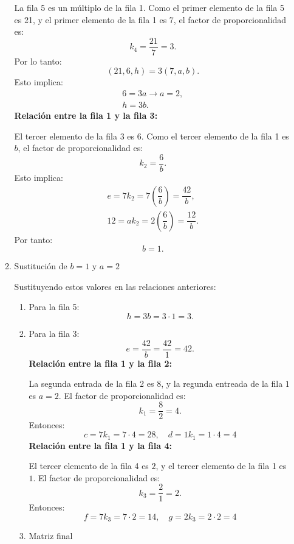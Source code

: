 \begin{enumerate}[label=\color{red}\textbf{\arabic*)}]
\begin{enumerate}[label=Paso \arabic*:]
            La fila 5 es un múltiplo de la fila 1. Como el primer elemento de la fila 5 es 21, y el primer elemento de la fila 1 es 7, el factor de proporcionalidad es: \[
            k_4=\dfrac{21}{7}=3.
            \] 
            Por lo tanto: \[
                (21,6,h)=3(7,a,b).
            \] 
            Esto implica: \[
                \begin{array}{c}
                    6=3a\longrightarrow a=2,\\
                    h=3b.
                \end{array}
            \] 
            \textbf{Relación entre la fila 1 y la fila 3:}

            El tercer elemento de la fila 3 es 6. Como el tercer elemento de la fila 1 es $b$, el factor de proporcionalidad es: \[
            k_2=\dfrac{6}{b}.
            \] 
            Esto implica: \[
            \begin{array}{c}
                e=7k_2=7\left( \dfrac{6}{b} \right) =\dfrac{42}{b},\\
                12=ak_2=2\left( \dfrac{6}{b} \right) =\dfrac{12}{b}.
            \end{array}
            \] 
            Por tanto: \[
           b=1. 
            \] 
        \item Sustitución de $b=1$ y $a=2$

            Sustituyendo estos valores en las relaciones anteriores:
             \begin{enumerate}[label=\arabic*)]
                \item Para la fila 5: \[
                h=3b=3\cdot 1=3.
                \] 
            \item Para la fila 3: \[
            e=\dfrac{42}{b}=\dfrac{42}{1}=42.
            \] 
            \textbf{Relación entre la fila 1 y la fila 2:}

            La segunda entrada de la fila 2 es $8$, y la regunda entreada de la fila $1$ es  $a=2$. El factor de proporcionalidad es: \[
            k_1=\dfrac{8}{2}=4.
            \] 
            Entonces: \[
            c=7k_1=7\cdot 4=28,\quad d=1k_1=1\cdot 4=4
            \] 
            \textbf{Relación entre la fila 1 y la fila 4:} 

            El tercer elemento de la fila 4 es $2$, y el tercer elemento de la fila 1 es  $1$. El factor de proporcionalidad es:  \[
            k_3=\dfrac{2}{1}=2.
            \] 
            Entonces: \[
            f=7k_3=7\cdot 2=14,\quad g=2k_3=2\cdot 2=4
            \] 
        \item Matriz final


\end{enumerate}
\end{enumerate}
\end{enumerate}
